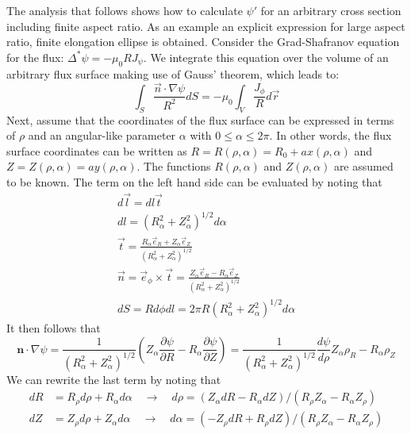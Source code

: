 The analysis that follows shows how to calculate $\psi'$ for an arbitrary cross section including finite aspect ratio. As an example an explicit expression for large aspect ratio, finite elongation ellipse is obtained. Consider the Grad-Shafranov equation for the flux: $\Delta^* \psi = -\mu_0 R J_\psi$. We integrate this equation over the volume of an arbitrary flux surface making use of Gauss' theorem, which leads to:
\begin{equation}
	\label{eq:gauss}
	\int_S \frac{ \vec n \cdot \nabla \psi }{R^2} dS = -\mu_0 \int_V \frac{ J_\phi}{R} d \vec r
\end{equation}
Next, assume that the coordinates of the flux surface can be expressed in terms of $\rho$ and an angular-like parameter $\alpha$ with $0 \le \alpha \le 2 \pi$. In other words, the flux surface coordinates can be written as $R = R(\rho,\alpha) = R_0 + a x(\rho, \alpha)$ and $Z = Z(\rho,\alpha) = a y(\rho, \alpha)$. The functions $R(\rho,\alpha)$ and $Z(\rho,\alpha)$ are assumed to be known. The term on the left hand side can be evaluated by noting that
\begin{gather}
	d \vec l = dl \vec t \\
	dl = ( R_\alpha^2 + Z_\alpha^2 )^{1/2} d\alpha \\
	\vec t = \frac{R_\alpha \vec e_R + Z_\alpha \vec e_Z }{ ( R_\alpha^2 + Z_\alpha^2 )^{1/2} } \\
	\vec n = \vec e_\phi \times \vec t = \frac{ Z_\alpha \vec e_R - R_\alpha \vec e_Z }{ ( R_\alpha^2 + Z_\alpha^2 )^{1/2} } \\
	dS = R d \phi d l  = 2 \pi R ( R_\alpha^2 + Z_\alpha^2 )^{1/2} d \alpha
\end{gather}
It then follows that
\begin{equation}
	\mathbf { n } \cdot \nabla \psi = \frac { 1 } { \left( R _ { \alpha } ^ { 2 } + Z _ { \alpha } ^ { 2 } \right) ^ { 1 / 2 } } \left( Z _ { \alpha } \frac { \partial \psi } { \partial R } - R _ { \alpha } \frac { \partial \psi } { \partial Z } \right) = \frac { 1 } { \left( R _ { \alpha } ^ { 2 } + Z _ { \alpha } ^ { 2 } \right) ^ { 1 / 2 } } \frac { d \psi } { d \rho } Z _ { \alpha } \rho _ { R } - R _ { \alpha } \rho _ { Z }
\end{equation}
We can rewrite the last term by noting that
\begin{equation}
	\begin{aligned} 
	d R & = R _ { \rho } d \rho + R _ { \alpha } d \alpha \quad \rightarrow \quad d \rho = \left( Z _ { \alpha } d R - R _ { \alpha } d Z \right) / \left( R _ { \rho } Z _ { \alpha } - R _ { \alpha } Z _ { \rho } \right) \\ d Z & = Z _ { \rho } d \rho + Z _ { \alpha } d \alpha \quad \rightarrow \quad d \alpha = \left( - Z _ { \rho } d R + R _ { \rho } d Z \right) / \left( R _ { \rho } Z _ { \alpha } - R _ { \alpha } Z _ { \rho } \right) 
	\end{aligned}
\end{equation}
